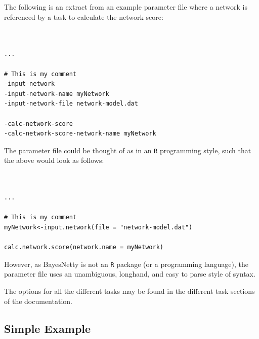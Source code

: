 \documentclass[a4paper,12pt]{article}
\newcommand{\code}[1]{{\footnotesize{{\tt #1}}}}
\begin{document}
The following is an extract from an example parameter file where a network is referenced by a task to calculate the network score: 
\vspace{0.35cm} \begin{lstlisting}


...

# This is my comment
-input-network
-input-network-name myNetwork
-input-network-file network-model.dat

-calc-network-score
-calc-network-score-network-name myNetwork

\end{lstlisting} \vspace{0.35cm}
The parameter file could be thought of as in an \code{R} programming style, such that the above would look as follows: 
\vspace{0.35cm} \begin{lstlisting}


...

# This is my comment
myNetwork<-input.network(file = "network-model.dat")

calc.network.score(network.name = myNetwork)

\end{lstlisting} \vspace{0.35cm}
However, as BayesNetty is not an \code{R} package (or a programming language), the parameter file uses an unambiguous, longhand, and easy to parse style of syntax. 

The options for all the different tasks may be found in the different task sections of the documentation. 


\subsection{Simple Example}
\label{simple-example}
\end{document}

